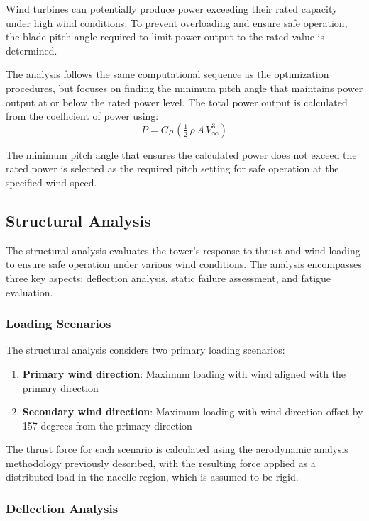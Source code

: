 \documentclass[11pt]{article}
\begin{document}
Wind turbines can potentially produce power exceeding their rated capacity under high wind conditions. To prevent overloading and ensure safe operation, the blade pitch angle required to limit power output to the rated value is determined.

The analysis follows the same computational sequence as the optimization procedures, but focuses on finding the minimum pitch angle that maintains power output at or below the rated power level. The total power output is calculated from the coefficient of power using:
\begin{equation}
P = C_P\,\left(\tfrac{1}{2}\,\rho\,A\,V_\infty^{3}\right)
\label{eq:P_from_CP}
\end{equation}

The minimum pitch angle that ensures the calculated power does not exceed the rated power is selected as the required pitch setting for safe operation at the specified wind speed.

\subsection{Structural Analysis}

The structural analysis evaluates the tower's response to thrust and wind loading to ensure safe operation under various wind conditions. The analysis encompasses three key aspects: deflection analysis, static failure assessment, and fatigue evaluation.

\subsubsection{Loading Scenarios}

The structural analysis considers two primary loading scenarios:
\begin{enumerate}
    \item \textbf{Primary wind direction}: Maximum loading with wind aligned with the primary direction
    \item \textbf{Secondary wind direction}: Maximum loading with wind direction offset by 157 degrees from the primary direction
\end{enumerate}

The thrust force for each scenario is calculated using the aerodynamic analysis methodology previously described, with the resulting force applied as a distributed load in the nacelle region, which is assumed to be rigid.

\subsubsection{Deflection Analysis}
\end{document}
